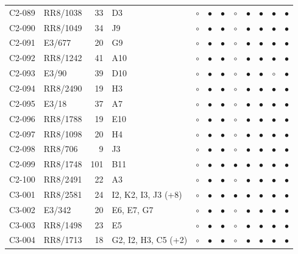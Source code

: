 {\begin{longtable}{llrp{3.9cm}cccccccc}
    C2-089 & RR8/1038 & 33 & D3 & $\circ$ & $\bullet$ & $\bullet$ & $\circ$ & $\bullet$ & $\bullet$ & $\bullet$ & $\bullet$ \\
    C2-090 & RR8/1049 & 34 & J9 & $\circ$ & $\bullet$ & $\bullet$ & $\circ$ & $\bullet$ & $\bullet$ & $\bullet$ & $\bullet$ \\
    C2-091 & E3/677 & 20 & G9 & $\circ$ & $\bullet$ & $\bullet$ & $\circ$ & $\bullet$ & $\bullet$ & $\bullet$ & $\bullet$ \\
    C2-092 & RR8/1242 & 41 & A10 & $\circ$ & $\bullet$ & $\bullet$ & $\circ$ & $\bullet$ & $\bullet$ & $\bullet$ & $\bullet$ \\
    C2-093 & E3/90 & 39 & D10 & $\circ$ & $\bullet$ & $\bullet$ & $\circ$ & $\bullet$ & $\bullet$ & $\circ$ & $\bullet$ \\
    C2-094 & RR8/2490 & 19 & H3 & $\circ$ & $\bullet$ & $\bullet$ & $\circ$ & $\bullet$ & $\bullet$ & $\bullet$ & $\bullet$ \\
    C2-095 & E3/18 & 37 & A7 & $\circ$ & $\bullet$ & $\bullet$ & $\circ$ & $\bullet$ & $\bullet$ & $\bullet$ & $\bullet$ \\
    C2-096 & RR8/1788 & 19 & E10 & $\circ$ & $\bullet$ & $\bullet$ & $\circ$ & $\bullet$ & $\bullet$ & $\bullet$ & $\bullet$ \\
    C2-097 & RR8/1098 & 20 & H4 & $\circ$ & $\bullet$ & $\bullet$ & $\circ$ & $\bullet$ & $\bullet$ & $\bullet$ & $\bullet$ \\
    C2-098 & RR8/706 & 9 & J3 & $\circ$ & $\bullet$ & $\bullet$ & $\circ$ & $\bullet$ & $\bullet$ & $\bullet$ & $\bullet$ \\
    C2-099 & RR8/1748 & 101 & B11 & $\circ$ & $\bullet$ & $\bullet$ & $\bullet$ & $\bullet$ & $\bullet$ & $\bullet$ & $\bullet$ \\
    C2-100 & RR8/2491 & 22 & A3 & $\circ$ & $\bullet$ & $\bullet$ & $\circ$ & $\bullet$ & $\bullet$ & $\bullet$ & $\bullet$ \\
    C3-001 & RR8/2581 & 24 & I2, K2, I3, J3 (+8) & $\circ$ & $\bullet$ & $\bullet$ & $\bullet$ & $\bullet$ & $\bullet$ & $\bullet$ & $\bullet$ \\
    C3-002 & E3/342 & 20 & E6, E7, G7 & $\circ$ & $\bullet$ & $\bullet$ & $\circ$ & $\bullet$ & $\bullet$ & $\bullet$ & $\bullet$ \\
    C3-003 & RR8/1498 & 23 & E5 & $\circ$ & $\bullet$ & $\bullet$ & $\circ$ & $\bullet$ & $\bullet$ & $\bullet$ & $\bullet$ \\
    C3-004 & RR8/1713 & 18 & G2, I2, H3, C5 (+2) & $\circ$ & $\bullet$ & $\bullet$ & $\circ$ & $\bullet$ & $\bullet$ & $\bullet$ & $\bullet$ \\

\end{longtable}}
